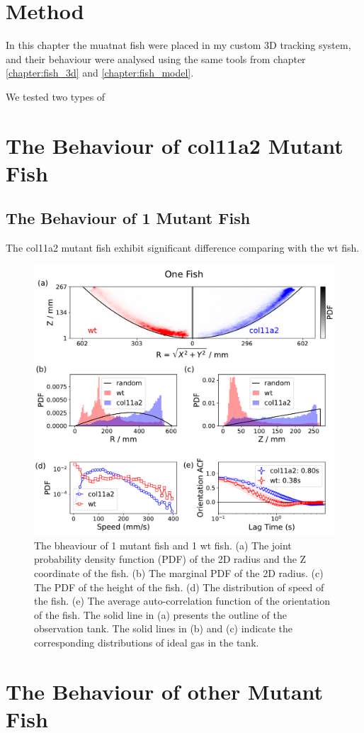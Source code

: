 \documentclass[11pt,twoside]{report}
\begin{document}
\section{Method}

In this chapter the muatnat fish were placed in my custom 3D tracking system, and their behaviour were analysed using the same tools from chapter \ref{chapter:fish_3d} and \ref{chapter:fish_model}.

We tested two types of 

\section{The Behaviour of col11a2 Mutant Fish}

\subsection{The Behaviour of 1 Mutant Fish}

The col11a2 mutant fish exhibit significant difference comparing with the wt fish.


\begin{figure}
  \includegraphics[width=\linewidth]{figOneFish}
  \caption{\label{fig:one_fish_mutant}
  	The bheaviour of 1 mutant fish and 1 wt fish.
  	(a) The joint probability density function (PDF) of the 2D radius and the Z coordinate of the fish.
  	(b) The marginal PDF of the 2D radius. 
  	(c) The PDF of the height of the fish.
  	(d) The distribution of speed of the fish.
  	(e) The average auto-correlation function of the orientation of the fish.
  	The solid line in (a) presents the outline of the observation tank. The solid lines in (b) and (c) indicate the corresponding distributions of ideal gas in the tank.
  }
\end{figure}



\section{The Behaviour of other Mutant Fish} 
\end{document}
